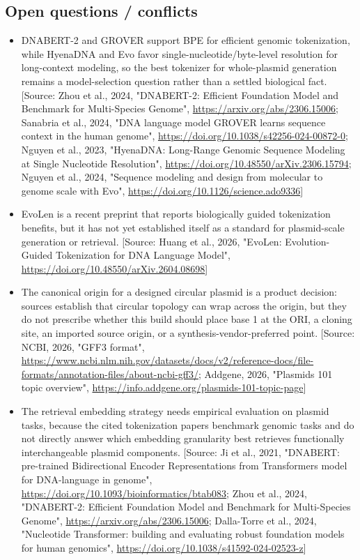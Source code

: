 \documentclass[11pt]{report}
\begin{document}
\subsection{Open questions / conflicts}
\begin{itemize}
\item DNABERT-2 and GROVER support BPE for efficient genomic tokenization, while HyenaDNA and Evo favor single-nucleotide/byte-level resolution for long-context modeling, so the best tokenizer for whole-plasmid generation remains a model-selection question rather than a settled biological fact. [Source: Zhou et al., 2024, "DNABERT-2: Efficient Foundation Model and Benchmark for Multi-Species Genome", \url{https://arxiv.org/abs/2306.15006}; Sanabria et al., 2024, "DNA language model GROVER learns sequence context in the human genome", \url{https://doi.org/10.1038/s42256-024-00872-0}; Nguyen et al., 2023, "HyenaDNA: Long-Range Genomic Sequence Modeling at Single Nucleotide Resolution", \url{https://doi.org/10.48550/arXiv.2306.15794}; Nguyen et al., 2024, "Sequence modeling and design from molecular to genome scale with Evo", \url{https://doi.org/10.1126/science.ado9336}]
\item EvoLen is a recent preprint that reports biologically guided tokenization benefits, but it has not yet established itself as a standard for plasmid-scale generation or retrieval. [Source: Huang et al., 2026, "EvoLen: Evolution-Guided Tokenization for DNA Language Model", \url{https://doi.org/10.48550/arXiv.2604.08698}]
\item The canonical origin for a designed circular plasmid is a product decision: sources establish that circular topology can wrap across the origin, but they do not prescribe whether this build should place base 1 at the ORI, a cloning site, an imported source origin, or a synthesis-vendor-preferred point. [Source: NCBI, 2026, "GFF3 format", \url{https://www.ncbi.nlm.nih.gov/datasets/docs/v2/reference-docs/file-formats/annotation-files/about-ncbi-gff3/}; Addgene, 2026, "Plasmids 101 topic overview", \url{https://info.addgene.org/plasmids-101-topic-page}]
\item The retrieval embedding strategy needs empirical evaluation on plasmid tasks, because the cited tokenization papers benchmark genomic tasks and do not directly answer which embedding granularity best retrieves functionally interchangeable plasmid components. [Source: Ji et al., 2021, "DNABERT: pre-trained Bidirectional Encoder Representations from Transformers model for DNA-language in genome", \url{https://doi.org/10.1093/bioinformatics/btab083}; Zhou et al., 2024, "DNABERT-2: Efficient Foundation Model and Benchmark for Multi-Species Genome", \url{https://arxiv.org/abs/2306.15006}; Dalla-Torre et al., 2024, "Nucleotide Transformer: building and evaluating robust foundation models for human genomics", \url{https://doi.org/10.1038/s41592-024-02523-z}]

\end{itemize}
\end{document}
